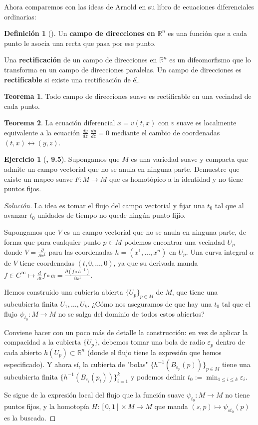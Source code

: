 \documentclass[spanish]{book}
\theoremstyle{definition}
\newtheorem*{defn}{Definición}
\newtheorem*{teo}{Teorema}
\newtheorem*{ejer*}{Ejercicio}
\newcommand{\R}{\mathbb{R}}
\newcommand{\Cinf}{C^\infty}
\begin{document}
	Ahora comparemos con las ideas de Arnold en su libro de ecuaciones diferenciales ordinarias:
	\begin{defn}[\cite{Arnold}]
		Un \textbf{campo de direcciones en $\R^n$} es una función que a cada punto le asocia una recta que pasa por ese punto.
		
		Una \textbf{rectificación} de un campo de direcciones en $\R^n$ es un difeomorfismo que lo transforma en un campo de direcciones paralelas. Un campo de direcciones es \textbf{rectificable} si existe una rectificación de él.
	\end{defn}
	\begin{teo}
		Todo campo de direcciones suave es rectificable en una vecindad de cada punto.
	\end{teo}
	\begin{teo}
		La ecuación diferencial $\dot{x}=v(t,x)$ con $v$ suave es localmente equivalente a la ecuación $\frac{dy}{dz}$ $\frac{dy}{dz}=0$ mediante el cambio de coordenadas $(t,x)\leftrightarrow(y,z)$.
	\end{teo}
	\begin{ejer*}[\cite{Lee}\textbf{, 9.5}]
		Supongamos que $M$ es una variedad suave y compacta que admite un campo vectorial que no se anula en ninguna parte. Demuestre que existe un mapeo suave $F:M\to M$ que es homotópico a la identidad y no tiene puntos fijos.
	\end{ejer*}
	\begin{proof}[Solución]
		La idea es tomar el flujo del campo vectorial y fijar una $t_0$ tal que al avanzar $t_0$ unidades de tiempo no quede ningún punto fijio.
		
		Supongamos que $V$ es un campo vectorial que no se anula en ninguna parte, de forma que para cualquier punto $p\in M$ podemos encontrar una vecindad $U_p$ donde $V=\frac{\partial}{\partial x^1}$ para las coordenadas $h=(x^1,\ldots,x^n)$ en $U_p$. Una curva integral $\alpha$ de $V$ tiene coordenadas $(t,0,\ldots,0)$, ya que su derivada manda $f\in\Cinf\mapsto\frac{d}{dt}f\circ\alpha=\frac{\partial (f\circ h^{-1})}{\partial x^1}$.
		
		Hemos construido una cubierta abierta $\{U_p\}_{p\in M}$ de $M$, que tiene una subcubierta finita $U_1,\ldots, U_k$. ¿Cómo nos aseguramos de que hay una $t_0$ tal que el flujo $\psi_{t_0}:M\to M$ no se salga del dominio de todos estos abiertos?
		
		Conviene hacer con un poco más de detalle la construcción: en vez de aplicar la compacidad a la cubierta $\{U_p\}$, debemos tomar una bola de radio $\varepsilon_p$ dentro de cada abierto $h(U_p)\subset\R^n$ (donde el flujo tiene la expresión que hemos especificado). Y ahora sí, la cubierta de "bolas" $\{h^{-1}(B_{\varepsilon_p}(p))\}_{p\in M}$ tiene una subcubierta finita $\{h^{-1}(B_{\varepsilon_i}(p_i))\}_{i=1}^k$ y podemos definir $t_0:=\min_{1\leq i\leq k}\varepsilon_i$.
		
		Se sigue de la expresión local del flujo que la función suave $\psi_{t_0}:M\to M$ no tiene puntos fijos, y la homotopía $H:[0,1]\times M\to M$ que manda $(s,p)\mapsto \psi_{st_0}(p)$ es la buscada.
	\end{proof}
\end{document}
